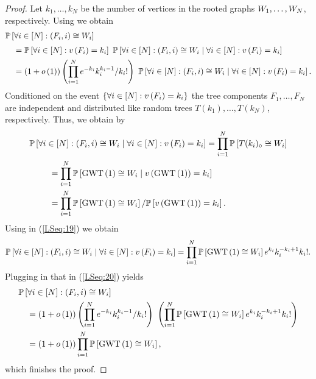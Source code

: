 \begin{proof}
Let $k_1, \ldots, k_N$ be the number of vertices in the rooted graphs $W_1, \ldots, W_N$, respectively. Using  we obtain
\begin{align}\label{LSeq:20}
&\mathbb{P}\left[\forall i\in[N]:\left(F_i, i\right)\cong W_i\right]
\nonumber
\\[0.1cm]
&~~~=\mathbb{P}\left[\forall i\in[N]:v\left({F_i}\right)=k_i\right]~\mathbb{P}\left[\forall i\in[N]:\left(F_i, i\right)\cong W_i \;\middle|\; \forall i\in[N]:v\left({F_i}\right)=k_i\right]\nonumber
\\
&~~~=\left(1+o\left(1\right)\right)\left(\prod_{i=1}^{N}e^{-k_i}k_i^{k_i-1}/k_i!\right)~\mathbb{P}\left[\forall i\in[N]:\left(F_i, i\right)\cong W_i \;\middle|\; \forall i\in[N]:v\left({F_i}\right)=k_i\right].
\end{align}
Conditioned on the event $\left\{\forall i\in[N]:v\left({F_i}\right)=k_i\right\}$ the tree components $F_1, \ldots, F_N$ are independent and distributed like random trees $T(k_1), \ldots, T(k_N)$, respectively. Thus, we obtain by 
\begin{align}\label{LSeq:19}
&\mathbb{P}\left[\forall i\in[N]:\left(F_i, i\right)\cong W_i \;\middle|\; \forall i\in[N]:v\left({F_i}\right)=k_i\right]=\prod_{i=1}^{N}\mathbb{P}\left[T(k_i)_\circ\cong W_i\right]\nonumber
\\
&~~~~~~~=\prod_{i=1}^{N}\mathbb{P}\left[\operatorname{GWT}\left(1\right)\cong W_i \;\middle|\; v\left({\operatorname{GWT}\left(1\right)}\right)=k_i\right]\nonumber
\\
&~~~~~~~=\prod_{i=1}^{N}\mathbb{P}\left[\operatorname{GWT}\left(1\right)\cong W_i\right]/\mathbb{P}\left[v\left({\operatorname{GWT}\left(1\right)}\right)=k_i\right].
\end{align}
Using  in (\ref{LSeq:19}) we obtain
\begin{align*}
\mathbb{P}\left[\forall i\in[N]:\left(F_i, i\right)\cong W_i \;\middle|\; \forall i\in[N]:v\left({F_i}\right)=k_i\right]=\prod_{i=1}^{N}\mathbb{P}\left[\operatorname{GWT}\left(1\right)\cong W_i\right]e^{k_i}k_i^{-k_i+1}k_i!.
\end{align*}
Plugging in that in (\ref{LSeq:20}) yields
\begin{align*}
&\mathbb{P}\left[\forall i\in[N]:\left(F_i, i\right)\cong W_i\right]
\\
&~~~=\left(1+o\left(1\right)\right)\left(\prod_{i=1}^{N}e^{-k_i}k_i^{k_i-1}/k_i!\right)~\left(\prod_{i=1}^{N}\mathbb{P}\left[\operatorname{GWT}\left(1\right)\cong W_i\right]e^{k_i}k_i^{-k_i+1}k_i!\right)\\
&~~~=\left(1+o\left(1\right)\right)\prod_{i=1}^{N}\mathbb{P}\left[\operatorname{GWT}\left(1\right)\cong W_i\right],
\end{align*}
which finishes the proof.
\end{proof}

